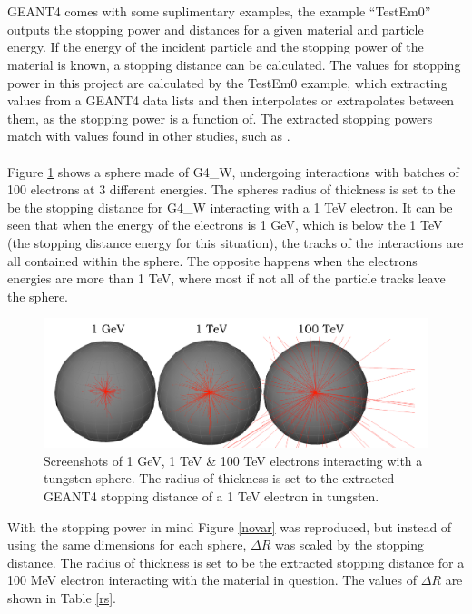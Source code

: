 \documentclass[12pt,a4paper]{article}
\begin{document}
\\\\
\noindent GEANT4 comes with some suplimentary examples, the example ``TestEm0'' \cite{emo} outputs the stopping power and distances for a given material and particle energy. If the energy of the incident particle and the stopping power of the material is known, a stopping distance can be calculated. The values for stopping power in this project are calculated by the TestEm0 example, which extracting values from a GEANT4 data lists and then interpolates or extrapolates between them, as the stopping power is a function of. The extracted stopping powers match with values found in other studies, such as \cite{stpdat}.
\\\\
Figure \ref{tung} shows a sphere made of G4\_W, undergoing interactions with batches of 100 electrons at 3 different energies. The spheres radius of thickness is set to the be the stopping distance for G4\_W interacting with a 1 TeV electron. It can be seen that when the energy of the electrons is 1 GeV, which is below the 1 TeV (the stopping distance energy for this situation), the tracks of the interactions are all contained within the sphere. The opposite happens when the electrons energies are more than 1 TeV, where most if not all of the particle tracks leave the sphere. 

\begin{figure}[h!]
\hspace*{1.4cm}\includegraphics[scale=0.5]{Images//BDSIM//Tungsten_Sphere.png}
\caption[width=\columnwidth]{Screenshots of 1 GeV, 1 TeV \& 100 TeV electrons interacting with a tungsten sphere. The radius of thickness is set to the extracted GEANT4 stopping distance of a 1 TeV electron in tungsten.}
\label{tung}
\end{figure}

\noindent With the stopping power in mind Figure \ref{novar} was reproduced, but instead of using the same dimensions for each sphere, $\Delta R$ was scaled by the stopping distance. The radius of thickness is set to be the extracted stopping distance for a 100 MeV electron interacting with the material in question. The values of $\Delta R$ are shown in Table \ref{rs}.
\end{document}
